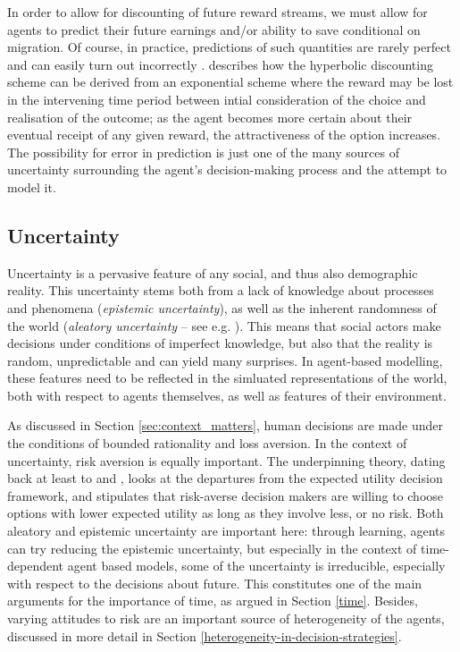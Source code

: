 \documentclass{article}
\begin{document}
In order to allow for discounting of future reward streams, we must allow for agents to predict their future earnings and/or ability to save conditional on migration. Of course, in practice, predictions of such quantities are rarely perfect and can easily turn out incorrectly \citep{Dustmann1997}. \cite{Sozou1998} describes how the hyperbolic discounting scheme can be derived from an exponential scheme where the reward may be lost in the intervening time period between intial consideration of the choice and realisation of the outcome; as the agent becomes more certain about their eventual receipt of any given reward, the attractiveness of the option increases. The possibility for error in prediction is just one of the many sources of uncertainty surrounding the agent's decision-making process and the attempt to model it. 

\subsection{Uncertainty}

Uncertainty is a pervasive feature of any social, and thus also demographic reality. This uncertainty stems both from a lack of knowledge about processes and phenomena (\textit{epistemic uncertainty}), as well as the inherent randomness of the world (\textit{aleatory uncertainty} -- see e.g. \citeauthor{OHagan2004} \citeyear{OHagan2004}). This means that social actors make decisions under conditions of imperfect knowledge, but also that the reality is random, unpredictable and can yield many surprises. In agent-based modelling, these features need to be reflected in the simluated representations of the world, both with respect to agents themselves, as well as features of their environment. 

As discussed in Section \ref{sec:context_matters}, human decisions are made under the conditions of bounded rationality and loss aversion. In the context of uncertainty, risk aversion is equally important. The underpinning theory, dating back at least to \citet{Pratt1964} and \citet{Arrow1965}, looks at the departures from the expected utility decision framework, and stipulates that risk-averse decision makers are willing to choose options with lower expected utility as long as they involve less, or no risk. Both aleatory and epistemic uncertainty are important here: through learning, agents can try reducing the epistemic uncertainty, but especially in the context of time-dependent agent based models, some of the uncertainty is irreducible, especially with respect to the decisions about future. This constitutes one of the main arguments for the importance of time, as argued in Section \ref{time}. Besides, varying attitudes to risk are an important source of heterogeneity of the agents, discussed in more detail in Section \ref{heterogeneity-in-decision-strategies}.
\end{document}
